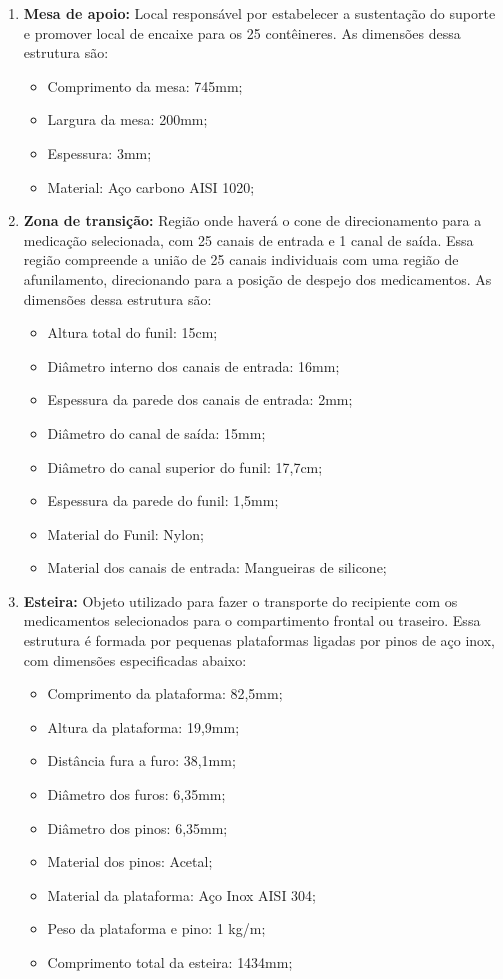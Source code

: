 \begin{enumerate}
\begin{enumerate}
\begin{itemize}
    \end{itemize}
\end{enumerate}
\item \textbf{Mesa de apoio:} Local responsável por estabelecer a sustentação do suporte e promover local de encaixe para os 25 contêineres. As dimensões dessa estrutura são:
\begin{itemize}
    \item Comprimento da mesa: 745mm;
    \item Largura da mesa: 200mm;
    \item Espessura: 3mm;
    \item Material: Aço carbono AISI 1020;
\end{itemize}
\item \textbf{Zona de transição:} Região onde haverá o cone de direcionamento para a medicação selecionada, com 25 canais de entrada e 1 canal de saída. Essa região compreende a união de 25 canais individuais com uma região de afunilamento, direcionando para a posição de despejo dos medicamentos. As dimensões dessa estrutura são:
\begin{itemize}
    \item Altura total do funil: 15cm;
    \item Diâmetro interno dos canais de entrada: 16mm;
    \item Espessura da parede dos canais de entrada: 2mm;
    \item Diâmetro do canal de saída: 15mm;
    \item Diâmetro do canal superior do funil: 17,7cm;
    \item Espessura da parede do funil: 1,5mm;
    \item Material do Funil: Nylon;
    \item Material dos canais de entrada: Mangueiras de silicone;
\end{itemize}
\item \textbf{Esteira:} Objeto utilizado para fazer o transporte do recipiente com os medicamentos selecionados para o compartimento frontal ou traseiro. Essa estrutura é formada por pequenas plataformas ligadas por pinos de aço inox, com dimensões especificadas abaixo:
\begin{itemize}
    \item Comprimento da plataforma: 82,5mm;
    \item Altura da plataforma: 19,9mm;
    \item Distância fura a furo: 38,1mm;
    \item Diâmetro dos furos: 6,35mm;
    \item Diâmetro dos pinos: 6,35mm;
    \item Material dos pinos: Acetal;
    \item Material da plataforma: Aço Inox AISI 304;
    \item Peso da plataforma e pino: 1 kg/m;
    \item Comprimento total da esteira: 1434mm;
\end{itemize}


\end{enumerate}
